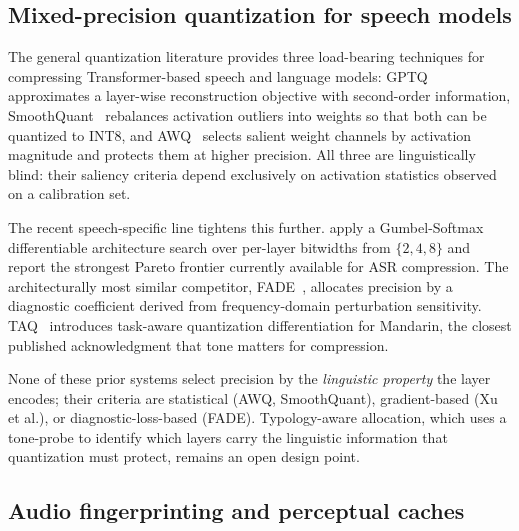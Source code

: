 \documentclass[a4paper,fleqn]{cas-dc}
\begin{document}
\subsection{Mixed-precision quantization for speech models}\label{sec:related:quant}

The general quantization literature provides three load-bearing techniques for compressing Transformer-based speech and language models: GPTQ~\citep{frantar2023gptq} approximates a layer-wise reconstruction objective with second-order information, SmoothQuant~\citep{xiao2023smoothquant} rebalances activation outliers into weights so that both can be quantized to INT8, and AWQ~\citep{lin2024awq} selects salient weight channels by activation magnitude and protects them at higher precision. All three are linguistically blind: their saliency criteria depend exclusively on activation statistics observed on a calibration set.

The recent speech-specific line tightens this further. \citet{xu2025mixedprecision} apply a Gumbel-Softmax differentiable architecture search over per-layer bitwidths from $\{2, 4, 8\}$ and report the strongest Pareto frontier currently available for ASR compression. The architecturally most similar competitor, FADE~\citep{fade2026}, allocates precision by a diagnostic coefficient derived from frequency-domain perturbation sensitivity. TAQ~\citep{taq2025} introduces task-aware quantization differentiation for Mandarin, the closest published acknowledgment that tone matters for compression.

None of these prior systems select precision by the \emph{linguistic property} the layer encodes; their criteria are statistical (AWQ, SmoothQuant), gradient-based (Xu et al.), or diagnostic-loss-based (FADE). Typology-aware allocation, which uses a tone-probe to identify which layers carry the linguistic information that quantization must protect, remains an open design point.

\subsection{Audio fingerprinting and perceptual caches}\label{sec:related:fingerprint}
\end{document}
